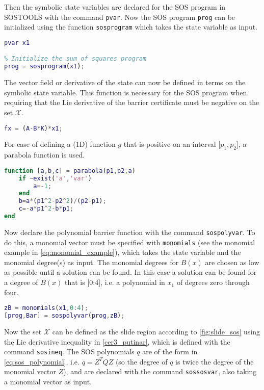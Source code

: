 Then the symbolic state variables are declared for the SOS program in SOSTOOLS with the command \texttt{pvar}. %
Now the SOS program \texttt{prog} can be initialized using the function \texttt{sosprogram} which takes the state variable as input. 
\begin{lstlisting}[language=matlab]
% Declare state variables
pvar x1

% Initialize the sum of squares program
prog = sosprogram(x1);
\end{lstlisting}
The vector field or derivative of the state can now be defined in terms on the symbolic state variable. This function is necessary for the SOS program when requiring that the Lie derivative of the barrier certificate must be negative on the set $\mathcal{X}$.
\begin{lstlisting}[language=matlab]
% Vector field dx/dt = fx (closed loop)
fx = (A-B*K)*x1;
\end{lstlisting}
For ease of defining a (1D) function $g$ that is positive on an interval [$p_1, p_2$], a parabola function is used.
\begin{lstlisting}[language=matlab]
function [a,b,c] = parabola(p1,p2,a)
	if ~exist('a','var')
		a=-1;
	end
	b=a*(p1^2-p2^2)/(p2-p1);
	c=-a*p1^2-b*p1;
end
\end{lstlisting}
Now declare the polynomial barrier function with the command \texttt{sospolyvar}. To do this, a monomial vector must be specified with \texttt{monomials} (see the monomial example in \autoref{eq:monomial_example}), which takes the state variable and the monomial degree(s) as input. The monomial degrees for $B(x)$ are chosen as low as possible until a solution can be found. In this case a solution can be found for a degree of $B(x)$ that is [0:4], i.e. a polynomial in $x_1$ of degrees zero through four.
\begin{lstlisting}[language=matlab]
% Declare the polynomial barrier function
zB = monomials(x1,0:4);
[prog,Bar] = sospolyvar(prog,zB);
\end{lstlisting}
Now the set $\mathcal{X}$ can be defined as the slide region according to \autoref{fig:slide_sos} using the Lie derivative inequality in \autoref{cer3_putinar}, which is defined with the command \texttt{sosineq}. The SOS polynomials $q$ are of the form in \autoref{eq:sos_polynomial}, i.e. $q=Z^TQZ$ (so the degree of $q$ is twice the degree of the monomial vector $Z$), and are declared with the command \texttt{sossosvar}, also taking a monomial vector as input.

